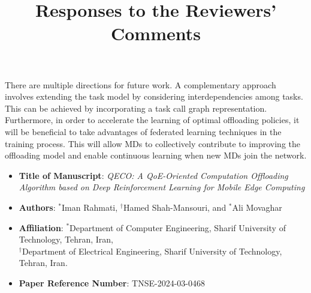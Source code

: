 \documentclass[12pt,draftclsnofoot,onecolumn]{IEEEtran}
\begin{document}
There are multiple directions for future work. A complementary approach involves extending the task model by considering interdependencies among tasks. This can be achieved by incorporating a task call graph representation. Furthermore, in order to accelerate the learning of optimal offloading policies, it will be beneficial to take advantages of federated learning techniques in the training process. This will allow MDs to collectively contribute to improving the offloading model and enable continuous learning when new MDs join the network.





\newpage





\color{black}

\title{Responses to the Reviewers' Comments}

\maketitle

\vspace{-1.5cm}

\setcounter{page}{1}

\begin{itemize}
	\item \textbf{Title of Manuscript}: \textit{QECO: A QoE-Oriented Computation Offloading Algorithm based on Deep Reinforcement Learning for Mobile Edge Computing}


	
	
	\item \textbf{Authors}:  $^\ast$Iman Rahmati, $^\dagger$Hamed Shah-Mansouri, and $^\ast$Ali Movaghar
	
	
	\item \textbf{Affiliation}: $^\ast$Department of Computer Engineering,  Sharif University of Technology, Tehran, Iran, \\ $^\dagger$Department of Electrical Engineering, Sharif University of Technology, Tehran, Iran.
	
	\item \textbf{Paper Reference Number}: TNSE-2024-03-0468 
	
\end{itemize}

\vspace{0.3cm}

\end{document}
